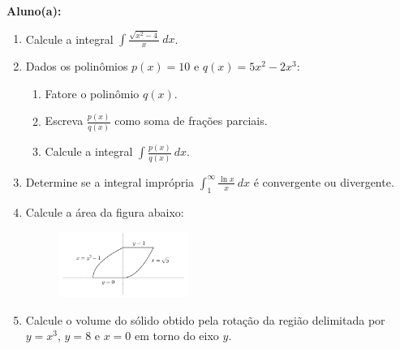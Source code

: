 \documentclass[a4paper,5pt]{amsbook}
\newcommand{\ds}{\displaystyle}
\begin{document}
\vspace{0.5cm}
{\bf Aluno(a):}\dotfill{}  %

\vspace{0.2cm}
\begin{enumerate}
	\vspace{0.5cm}
	\item Calcule a integral $\ds\int \frac{\sqrt{x^2-4}}{x}\ dx$.

	\vspace{0.5cm}
	\item Dados os polin\^omios $p(x) = 10$ e $q(x) = 5x^2-2x^3$:
		\begin{enumerate}
			\vspace{0.3cm}
			\item Fatore o polin\^omio $q(x)$.
			\vspace{0.3cm}
			\item Escreva $\ds\frac{p(x)}{q(x)}$ como soma de fra\c{c}\~oes parciais.
			\vspace{0.1cm}
			\item Calcule a integral $\ds\int\frac{p(x)}{q(x)}\ dx$.
		\end{enumerate}

	\vspace{0.5cm}
	\item Determine se a integral impr\'opria $\ds\int_1^\infty \frac{\ln{x}}{x}\ dx$ \'e convergente ou divergente.

	\vspace{0.5cm}
	\item Calcule a \'area da figura abaixo:
		\begin{figure}[h]
			\includegraphics[width=0.4\textwidth]{q3.pdf}
		\end{figure}

	\vspace{0.5cm}
	\item Calcule o volume do s\'olido obtido pela rota\c{c}\~ao da regi\~ao delimitada
		por $y=x^3$, $y=8$ e $x=0$ em torno do eixo $y$.
\end{enumerate}
\end{document}
